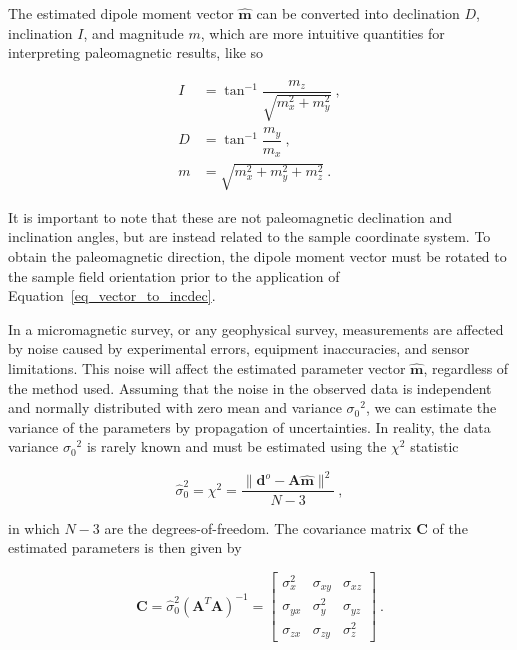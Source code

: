 \noindent
The estimated dipole moment vector $\hat{\mathbf{m}}$ can be converted into declination $D$, inclination $I$, and magnitude $m$, which are more intuitive quantities for interpreting paleomagnetic results, like so \citep{Tauxe2018}

\begin{equation}
\label{eq_vector_to_incdec}
\begin{aligned}
I &= \tan^{-1}\dfrac{m_z}{\sqrt{m_x^2 + m_y^2}} \ , \\
D &= \tan^{-1}\dfrac{m_y}{m_x} \ , \\
m &= \sqrt{m_x^2 + m_y^2 + m_z^2} \ .
\end{aligned}
\end{equation}

\noindent
It is important to note that these are not paleomagnetic declination and inclination angles, but are instead related to the sample coordinate system. To obtain the paleomagnetic direction, the dipole moment vector must be rotated to the sample field orientation prior to the application of Equation~\ref{eq_vector_to_incdec}.

In a micromagnetic survey, or any geophysical survey, measurements are affected by noise caused by experimental errors, equipment inaccuracies, and sensor limitations. This noise will affect the estimated parameter vector $\mathbf{\hat{m}}$, regardless of the method used. Assuming that the noise in the observed data is independent and normally distributed with zero mean and variance ${\sigma_0}^2$, we can estimate the variance of the parameters by propagation of uncertainties. In reality, the data variance  ${\sigma_0}^2$ is rarely known and must be estimated using the $\chi^2$ statistic \citep{Aster2019}

\begin{equation}
\label{eq_chi_square}
\hat{\sigma}_0^2 = {\chi}^2 = \dfrac{\|\mathbf{d}^o - \mathbf{A}\hat{\mathbf{m}}\|^2}{N - 3}\ ,
\end{equation}

\noindent
in which $N - 3$  are the degrees-of-freedom.
The covariance matrix $\mathbf{C}$ of the estimated parameters is then given by \citep{Aster2019}

\begin{equation}
\label{eq_covariance}
\mathbf{C}
=
\hat{\sigma}_0^2 (\mathbf{A}^T\mathbf{A})^{-1}
=
\begin{bmatrix}
\sigma_x^2 & \sigma_{xy} & \sigma_{xz} \\
\sigma_{yx} & \sigma_y^2 & \sigma_{yz} \\
\sigma_{zx} & \sigma_{zy} & \sigma_z^2
\end{bmatrix}
\ .
\end{equation}

